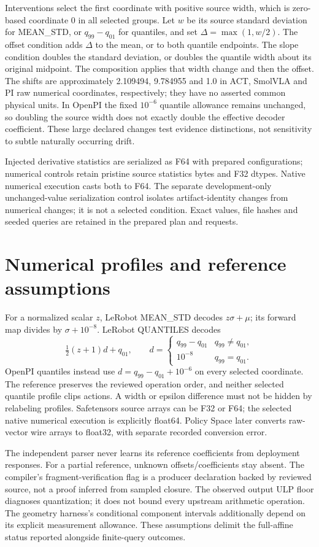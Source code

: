 Interventions select the first coordinate with positive source width, which is zero-based coordinate 0 in all selected groups. Let $w$ be its source standard deviation for MEAN\_STD, or $q_{99}-q_{01}$ for quantiles, and set $\Delta=\max(1,w/2)$. The offset condition adds $\Delta$ to the mean, or to both quantile endpoints. The slope condition doubles the standard deviation, or doubles the quantile width about its original midpoint. The composition applies that width change and then the offset. The shifts are approximately 2.109494, 9.784955 and 1.0 in ACT, SmolVLA and PI raw numerical coordinates, respectively; they have no asserted common physical units. In OpenPI the fixed $10^{-6}$ quantile allowance remains unchanged, so doubling the source width does not exactly double the effective decoder coefficient. These large declared changes test evidence distinctions, not sensitivity to subtle naturally occurring drift.

Injected derivative statistics are serialized as F64 with prepared configurations; numerical controls retain pristine source statistics bytes and F32 dtypes. Native numerical execution casts both to F64. The separate development-only unchanged-value serialization control isolates artifact-identity changes from numerical changes; it is not a selected condition. Exact values, file hashes and seeded queries are retained in the prepared plan and requests.

\section{Numerical profiles and reference assumptions}
For a normalized scalar $z$, LeRobot MEAN\_STD decodes $z\sigma+\mu$; its forward map divides by $\sigma+10^{-8}$. LeRobot QUANTILES decodes
\[
 \tfrac{1}{2}(z+1)d+q_{01},\qquad
 d=\begin{cases}q_{99}-q_{01}&q_{99}\ne q_{01},\\10^{-8}&q_{99}=q_{01}.\end{cases}
\]
OpenPI quantiles instead use $d=q_{99}-q_{01}+10^{-6}$ on every selected coordinate. The reference preserves the reviewed operation order, and neither selected quantile profile clips actions. A width or epsilon difference must not be hidden by relabeling profiles. Safetensors source arrays can be F32 or F64; the selected native numerical execution is explicitly float64. Policy Space later converts raw-vector wire arrays to float32, with separate recorded conversion error.

The independent parser never learns its reference coefficients from deployment responses. For a partial reference, unknown offsets/coefficients stay absent. The compiler's fragment-verification flag is a producer declaration backed by reviewed source, not a proof inferred from sampled closure. The observed output ULP floor diagnoses quantization; it does not bound every upstream arithmetic operation. The geometry harness's conditional component intervals additionally depend on its explicit measurement allowance. These assumptions delimit the full-affine status reported alongside finite-query outcomes.

